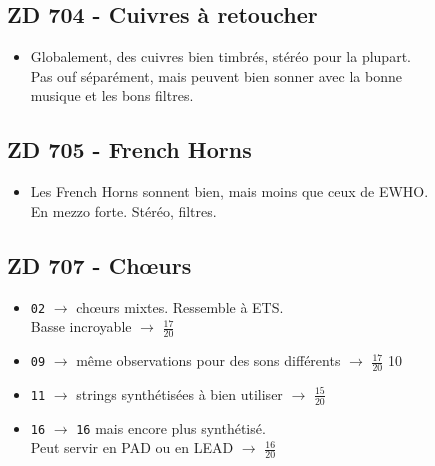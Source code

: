 \documentclass[a4paper, 13pt]{article}
\begin{document}
\vspace{1cm}
\subsection*{ZD 704 - Cuivres à retoucher}
\begin{itemize}
    \item Globalement, des cuivres bien timbrés, stéréo pour la plupart. \\ Pas ouf séparément, mais peuvent bien sonner avec la bonne \\ musique et les bons filtres.
\end{itemize}


\vspace{1cm}
\subsection*{ZD 705 - French Horns}
\begin{itemize}
    \item Les French Horns sonnent bien, mais moins que ceux de EWHO. \\ En mezzo forte. Stéréo, filtres.
\end{itemize}


\vspace{1cm}
\subsection*{ZD 707 - Ch\oe urs}
\begin{itemize}
    \item \texttt{02} $\rightarrow$ ch\oe urs mixtes. Ressemble à ETS.\\ Basse incroyable $\rightarrow$ \Large{$\frac{17}{20}$} \normalsize \vspace{0.2cm}
    \item \texttt{09} $\rightarrow$ même observations pour des sons différents $\rightarrow$ \Large{$\frac{17}{20}$} \normalsize \vspace{0.2cm}10
    \item \texttt{11} $\rightarrow$ strings synthétisées à bien utiliser $\rightarrow$ \Large{$\frac{15}{20}$} \normalsize \vspace{0.2cm}
    \item \texttt{16} $\rightarrow$ \texttt{16} mais encore plus synthétisé. \\ Peut servir en PAD ou en LEAD $\rightarrow$ \Large{$\frac{16}{20}$} \normalsize \vspace{0.2cm}
\end{itemize}
\end{document}
